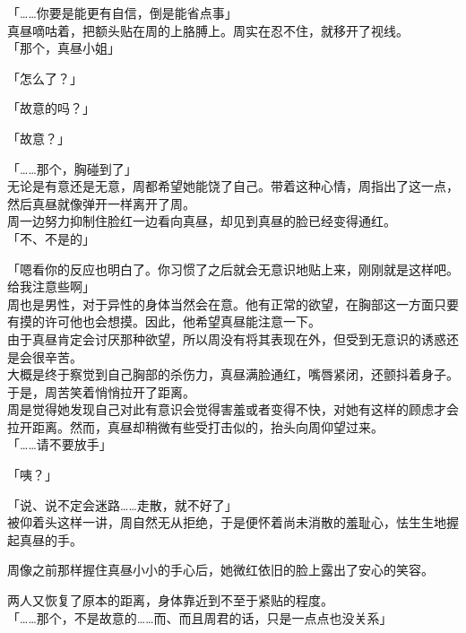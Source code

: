 「……你要是能更有自信，倒是能省点事」\\

真昼嘀咕着，把额头贴在周的上胳膊上。周实在忍不住，就移开了视线。\\

「那个，真昼小姐」

「怎么了？」

「故意的吗？」

「故意？」

「……那个，胸碰到了」\\

无论是有意还是无意，周都希望她能饶了自己。带着这种心情，周指出了这一点，然后真昼就像弹开一样离开了周。\\

周一边努力抑制住脸红一边看向真昼，却见到真昼的脸已经变得通红。\\

「不、不是的」

「嗯看你的反应也明白了。你习惯了之后就会无意识地贴上来，刚刚就是这样吧。给我注意些啊」\\

周也是男性，对于异性的身体当然会在意。他有正常的欲望，在胸部这一方面只要有摸的许可他也会想摸。因此，他希望真昼能注意一下。\\

由于真昼肯定会讨厌那种欲望，所以周没有将其表现在外，但受到无意识的诱惑还是会很辛苦。\\

大概是终于察觉到自己胸部的杀伤力，真昼满脸通红，嘴唇紧闭，还颤抖着身子。于是，周苦笑着悄悄拉开了距离。\\

周是觉得她发现自己对此有意识会觉得害羞或者变得不快，对她有这样的顾虑才会拉开距离。然而，真昼却稍微有些受打击似的，抬头向周仰望过来。\\

「……请不要放手」

「咦？」

「说、说不定会迷路……走散，就不好了」\\

被仰着头这样一讲，周自然无从拒绝，于是便怀着尚未消散的羞耻心，怯生生地握起真昼的手。

周像之前那样握住真昼小小的手心后，她微红依旧的脸上露出了安心的笑容。

两人又恢复了原本的距离，身体靠近到不至于紧贴的程度。\\

「……那个，不是故意的……而、而且周君的话，只是一点点也没关系」

